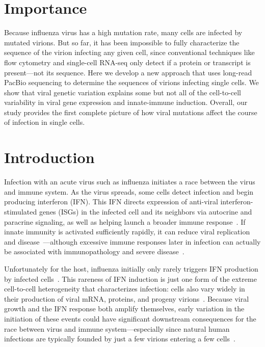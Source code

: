 \documentclass[]{article}
\begin{document}
\section*{Importance}
Because influenza virus has a high mutation rate, many cells are infected by mutated virions.
But so far, it has been impossible to fully characterize the sequence of the virion infecting any given cell, since conventional techniques like flow cytometry and single-cell RNA-seq only detect if a protein or transcript is present---not its sequence.
Here we develop a new approach that uses long-read PacBio sequencing to determine the sequences of virions infecting single cells.
We show that viral genetic variation explains some but not all of the cell-to-cell variability in viral gene expression and innate-immune induction.
Overall, our study provides the first complete picture of how viral mutations affect the course of infection in single cells.


\section*{Introduction}
Infection with an acute virus such as influenza initiates a race between the virus and immune system.
As the virus spreads, some cells detect infection and begin producing interferon (IFN).
This IFN directs expression of anti-viral interferon-stimulated genes (ISGs) in the infected cell and its neighbors via autocrine and paracrine signaling, as well as helping launch a broader immune response~\cite{stetson2006type,honda2006type}.
If innate immunity is activated sufficiently rapidly, it can reduce viral replication and disease~\cite{solov1969results,treanor1987intranasally,beilharz2007protection,kugel2009intranasal,steel2010transmission}---although excessive immune responses later in infection can actually be associated with immunopathology and severe disease~\cite{la2007question, iwasaki2014innate}.

Unfortunately for the host, influenza initially only rarely triggers IFN production by infected cells~\cite{kallfass2013visualizing, killip2017single}.
This rareness of IFN induction is just one form of the extreme cell-to-cell heterogeneity that characterizes infection: cells also vary widely in their production of viral mRNA, proteins, and progeny virions~\cite{russell2018extreme,steuerman2018dissection,sjaastad2018distinct,heldt2015single,wang2018cell}.
Because viral growth and the IFN response both amplify themselves, early variation in the initiation of these events could have significant downstream consequences for the race between virus and immune system---especially since natural human infections are typically founded by just a few virions entering a few cells~\cite{mccrone2018stochastic, xue2018reconciling, varble2014influenza}.
\end{document}
